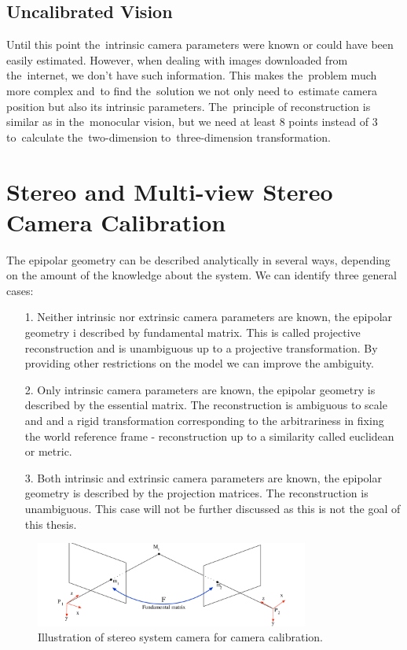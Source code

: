 \subsection*{Uncalibrated Vision}
Until this point the~intrinsic camera parameters were known or could have been easily estimated. However, when dealing with images downloaded from the~internet, we don't have such information. This makes the~problem much more complex and~to find the~solution we not only need to~estimate camera position but also its intrinsic parameters. The~principle of reconstruction is similar as in the~monocular vision, but we need at least 8 points instead of 3 to~calculate the~two-dimension to~three-dimension transformation.

\section{Stereo and Multi-view Stereo Camera Calibration}
The epipolar geometry can be described analytically in several ways, depending on the amount of the knowledge about the system. We can identify three general cases:
\begin{itemize}
	\item[1.] Neither intrinsic nor extrinsic camera parameters are known, the epipolar geometry i described by fundamental matrix. This is called projective reconstruction and is unambiguous up to a projective transformation. By providing other restrictions on the model we can improve the ambiguity.
	\item[2.] Only intrinsic camera parameters are known, the epipolar geometry is described by the essential matrix. The reconstruction is ambiguous to scale and and a rigid transformation corresponding to the arbitrariness in fixing the world reference frame - reconstruction up to a similarity called euclidean or metric.
	\item[3.] Both intrinsic and extrinsic camera parameters are known, the epipolar geometry is described by the projection matrices. The reconstruction is unambiguous. This case will not be further discussed as this is not the goal of this thesis.
\end{itemize}

\begin{figure}[ht]
	\begin{center}
		\includegraphics[keepaspectratio,width=9cm]{fig/stereo2.pdf}
	\end{center}
	\caption{Illustration of stereo system camera for camera calibration.}
	\label{fig:stereo2}
\end{figure}

